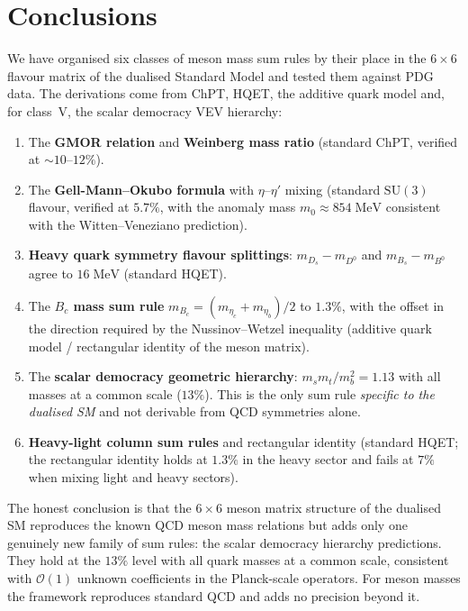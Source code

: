 \documentclass[11pt,a4paper]{article}
\newcommand{\SU}[1]{\mathrm{SU}(#1)}
\newcommand{\Ord}{\mathcal{O}}
\theoremstyle{plain}
\begin{document}
\section{Conclusions}
\label{sec:conclusions}

We have organised six classes of meson mass sum rules by their place
in the $6 \times 6$ flavour matrix of the dualised Standard Model and
tested them against PDG data.  The derivations come from ChPT, HQET,
the additive quark model and, for class~V, the scalar democracy VEV
hierarchy:

\begin{enumerate}[nosep]
  \item The \textbf{GMOR relation} and \textbf{Weinberg mass ratio}
    (standard ChPT, verified at $\sim 10$--$12\%$).
  \item The \textbf{Gell-Mann--Okubo formula} with $\eta$--$\eta'$
    mixing (standard $\SU{3}$ flavour, verified at $5.7\%$, with the
    anomaly mass $m_0 \approx 854\;\text{MeV}$ consistent with the
    Witten--Veneziano prediction).
  \item \textbf{Heavy quark symmetry flavour splittings}: $m_{D_s} -
    m_{D^0}$ and $m_{B_s} - m_{B^0}$ agree to $16\;\text{MeV}$
    (standard HQET).
  \item The \textbf{$B_c$ mass sum rule} $m_{B_c} = (m_{\eta_c} +
    m_{\eta_b})/2$ to $1.3\%$, with the offset in the direction required
    by the Nussinov--Wetzel inequality (additive quark model /
    rectangular identity of the meson matrix).
  \item The \textbf{scalar democracy geometric hierarchy}:
    $m_s m_t/m_b^2 = 1.13$ with all masses at a common scale ($13\%$).
    This is the only sum rule \emph{specific to the dualised SM} and
    not derivable from QCD symmetries alone.
  \item \textbf{Heavy-light column sum rules} and rectangular identity
    (standard HQET; the rectangular identity holds at $1.3\%$ in the
    heavy sector and fails at $7\%$ when mixing light and heavy
    sectors).
\end{enumerate}

The honest conclusion is that the $6 \times 6$ meson matrix structure
of the dualised SM reproduces the known QCD meson mass relations but
adds only one genuinely new family of sum rules: the scalar democracy
hierarchy predictions.  They hold at the $13\%$ level with all quark
masses at a common scale, consistent with $\Ord(1)$ unknown
coefficients in the Planck-scale operators.  For meson masses the
framework reproduces standard QCD and adds no precision beyond it.
\end{document}
